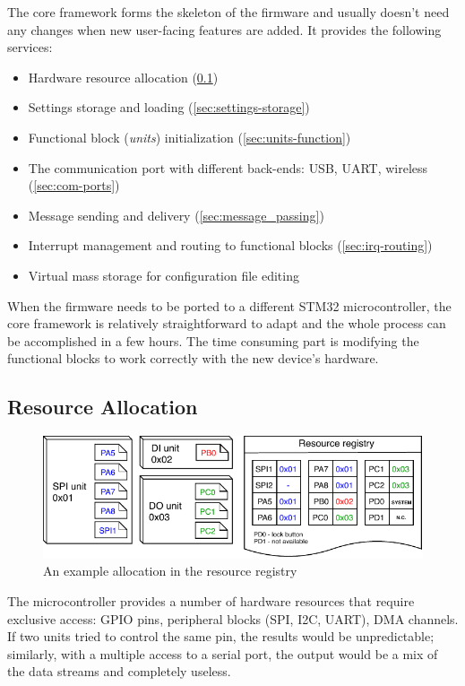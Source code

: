 The core framework forms the skeleton of the firmware and usually doesn't need any changes when new user-facing features are added. It provides the following services:

\begin{itemize}
	\item Hardware resource allocation (\ref{sec:res-allocation})
	\item Settings storage and loading (\ref{sec:settings-storage})
	\item Functional block (\textit{units}) initialization (\ref{sec:units-function})
	\item The communication port with different back-ends: \gls{USB}, \gls{UART}, wireless (\ref{sec:com-ports})
	\item Message sending and delivery (\ref{sec:message_passing})
	\item Interrupt management and routing to functional blocks (\ref{sec:irq-routing})
	\item Virtual mass storage for configuration file editing
\end{itemize}

When the firmware needs to be ported to a different STM32 microcontroller, the core framework is relatively straightforward to adapt and the whole process can be accomplished in a few hours. The time consuming part is modifying the functional blocks to work correctly with the new device's hardware.


\subsection{Resource Allocation} \label{sec:res-allocation}

\begin{figure}[h]
	\centering
	\includegraphics[scale=1] {img/resource-repository.pdf}
	\caption{\label{fig:resource-repository}An example allocation in the resource registry}
\end{figure}

The microcontroller provides a number of hardware resources that require exclusive access: GPIO pins, peripheral blocks (\gls{SPI}, \gls{I2C}, \gls{UART}\textellipsis), \gls{DMA} channels. If two units tried to control the same pin, the results would be unpredictable; similarly, with a multiple access to a serial port, the output would be a mix of the data streams and completely useless.

